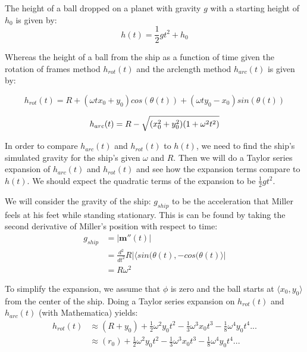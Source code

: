 \documentclass{amsart}
\renewcommand{\vec}{\textbf}
\theoremstyle{definition}
\begin{document}
The height of a ball dropped on a planet with gravity $g$ with a starting height of $h_0$ is given by:
\begin{equation}
    h(t)=\frac{1}{2}gt^2 +h_0
\end{equation}

Whereas the height of a ball from the ship as a function of time given the rotation of frames method $h_{rot}(t)$ and the arclength method $h_{arc}(t)$ is given by:

\begin{equation}
    h_{rot}(t) = R+(\omega t x_0 + y_0)cos(\theta(t))+(\omega t y_0 - x_0)sin(\theta (t))
\end{equation}

\begin{equation}
    h_{arc}(t) = R - \sqrt{(x_0^2+y_0^2)(1+\omega^2 t^2)} \\
\end{equation}

In order to compare $h_{arc}(t)$ and $h_{rot}(t)$ to $h(t)$, we need to find the ship's simulated gravity for the ship's given $\omega$ and $R$. Then we will do a Taylor series expansion of $h_{arc}(t)$ and $h_{rot}(t)$ and see how the expansion terms compare to $h(t)$. We should expect the quadratic terms of the expansion to be $\frac{1}{2}gt^2$.

We will consider the gravity of the ship: $g_{ship}$  to be the acceleration that Miller feels at his feet while standing stationary. This is can be found by taking the second derivative of Miller's position with respect to time:
\begin{equation}
\begin{split}
     g_{ship}&=\lvert\vec{m}''(t)\rvert \\
     &= \frac{d^2}{dt^2}R\lvert \langle sin(\theta(t),-cos(\theta(t)\rangle \rvert \\
     &=R \omega^2
\end{split}
\end{equation}

To simplify the expansion, we assume that  $\phi$ is zero and the ball starts at $\langle x_0,y_0\rangle$ from the center of the ship. Doing a Taylor series expansion on $h_{rot}(t)$ and $h_{arc}(t)$ (with Mathematica) yields:
\begin{equation}
\begin{split}
     h_{rot}(t) &\approx (R+y_0)+\frac{1}{2}\omega^2 y_0 t^2 - \frac{1}{3}\omega^3 x_0 t^3 -\frac{1}{8}\omega^4 y_0 t^4... \\
     &\approx (r_0)+\frac{1}{2}\omega^2 y_0 t^2 - \frac{1}{3}\omega^3 x_0 t^3 -\frac{1}{8}\omega^4 y_0 t^4...
\end{split}
\end{equation}
\end{document}
